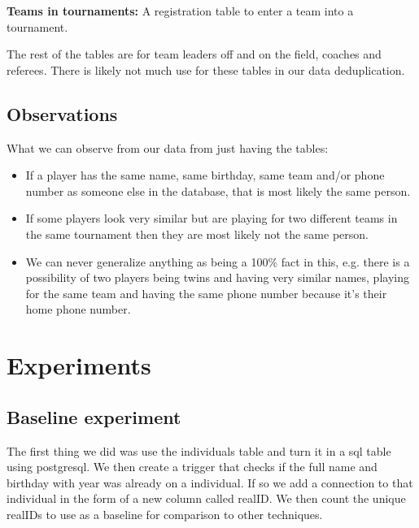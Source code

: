 \documentclass[tog]{acmsiggraph}
\begin{document}
\textbf{Teams in tournaments:} A registration table to enter a team into a tournament.

The rest of the tables are for team leaders off and on the field, coaches and referees. There is likely not much use for these tables in our data deduplication. 

\subsection{Observations}
What we can observe from our data from just having the tables:
\begin{itemize}
    \item If a player has the same name, same birthday, same team and/or phone number as someone else in the database, that is most likely the same person.
    \item If some players look very similar but are playing for two different teams in the same tournament then they are most likely not the same person.
    \item We can never generalize anything as being a 100\% fact in this, e.g. there is a possibility of two players being twins and having very similar names, playing for the same team and having the same phone number because it's their home phone number.
\end{itemize}


\section{Experiments}

\subsection{Baseline experiment}
The first thing we did was use the individuals table and turn it in a sql table using postgresql. We then create a trigger that checks if the full name and birthday with year was already on a individual. If so we add a connection to that individual in the form of a new column called realID. We then count the unique realIDs to use as a baseline for comparison to other techniques.
\end{document}

